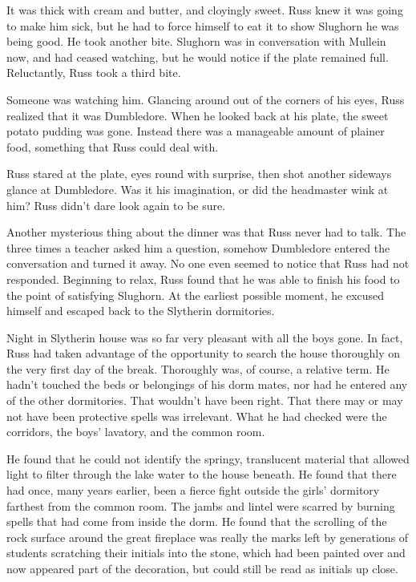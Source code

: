 \documentclass[a4paper,11pt]{article}
\begin{document}
It was thick with cream and butter, and cloyingly sweet. Russ knew it was going to make him sick, but he had to force himself to eat it to show Slughorn he was being good. He took another bite. Slughorn was in conversation with Mullein now, and had ceased watching, but he would notice if the plate remained full. Reluctantly, Russ took a third bite.

Someone was watching him. Glancing around out of the corners of his eyes, Russ realized that it was Dumbledore. When he looked back at his plate, the sweet potato pudding was gone. Instead there was a manageable amount of plainer food, something that Russ could deal with.

Russ stared at the plate, eyes round with surprise, then shot another sideways glance at Dumbledore. Was it his imagination, or did the headmaster wink at him? Russ didn't dare look again to be sure.

Another mysterious thing about the dinner was that Russ never had to talk. The three times a teacher asked him a question, somehow Dumbledore entered the conversation and turned it away. No one even seemed to notice that Russ had not responded. Beginning to relax, Russ found that he was able to finish his food to the point of satisfying Slughorn. At the earliest possible moment, he excused himself and escaped back to the Slytherin dormitories.

Night in Slytherin house was so far very pleasant with all the boys gone. In fact, Russ had taken advantage of the opportunity to search the house thoroughly on the very first day of the break. Thoroughly was, of course, a relative term. He hadn't touched the beds or belongings of his dorm mates, nor had he entered any of the other dormitories. That wouldn't have been right. That there may or may not have been protective spells was irrelevant. What he had checked were the corridors, the boys' lavatory, and the common room.

He found that he could not identify the springy, translucent material that allowed light to filter through the lake water to the house beneath. He found that there had once, many years earlier, been a fierce fight outside the girls' dormitory farthest from the common room. The jambs and lintel were scarred by burning spells that had come from inside the dorm. He found that the scrolling of the rock surface around the great fireplace was really the marks left by generations of students scratching their initials into the stone, which had been painted over and now appeared part of the decoration, but could still be read as initials up close.
\end{document}
